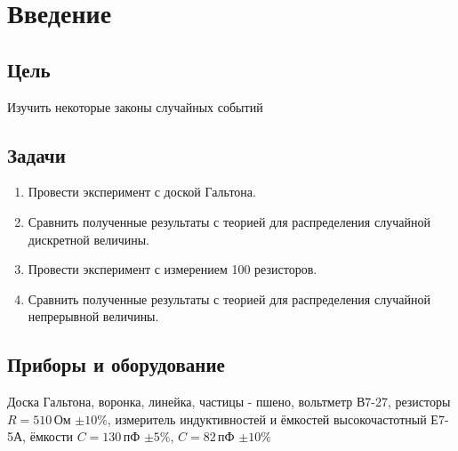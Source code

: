 \section{Введение}
\subsection{Цель}

Изучить некоторые законы случайных событий 
\subsection{Задачи}
\begin{enumerate}
	\item Провести эксперимент с доской Гальтона.
	
	\item Сравнить полученные результаты с теорией для распределения случайной дискретной величины. 
	
	\item Провести эксперимент с измерением 100 резисторов.
	
	\item  Сравнить полученные результаты с теорией для распределения случайной непрерывной величины.
	
\end{enumerate}
\subsection{Приборы и оборудование}
Доска Гальтона, воронка, линейка, частицы - пшено, вольтметр В7-27, резисторы $R = 510\,$Ом $\pm10\%$, измеритель индуктивностей и ёмкостей высокочастотный Е7-5А, ёмкости $ C = 130\,$пФ $\pm5\%$, $C = 82\,$пФ $\pm10\%$